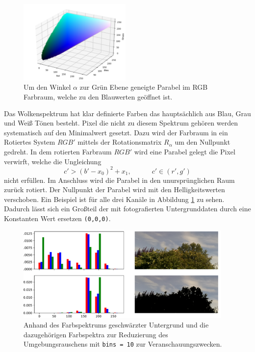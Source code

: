 \begin{figure}
		\centering
		\includegraphics[width=0.49\textwidth]{pictures/cut_cube.pdf}
		\caption{Um den Winkel $\alpha$ zur Grün Ebene geneigte Parabel im RGB 
				Farbraum, welche zu den Blauwerten geöffnet ist.}
				\label{fig:parabular}
\end{figure}
Das Wolkenspektrum hat klar definierte Farben das hauptsächlich aus Blau, Grau
und Weiß Tönen besteht.
Pixel die nicht zu diesem Spektrum gehören werden systematisch auf den
Minimalwert gesetzt.
Dazu wird der Farbraum in ein Rotiertes System $RGB'$ mittels der 
Rotationsmatrix $R_{\alpha}$ um den Nullpunkt gedreht. 
In dem rotierten Farbraum $RGB'$ wird eine Parabel gelegt die Pixel
verwirft, welche die Ungleichung 
\begin{equation}
		c' > (b' - x_0)^2 + x_1, \hspace{3em} c' \in (r', g')
\end{equation}
nicht erfüllen.
Im Anschluss wird die Parabel in den unursprünglichen Raum zurück
rotiert.
Der Nullpunkt der Parabel wird mit den Helligkeitswerten verschoben.
Ein Beispiel ist für alle  drei Kanäle in Abbildung \ref{fig:parabular} zu sehen.
Dadurch lässt sich ein Großteil der mit fotografierten Untergrunddaten durch
eine Konstanten Wert ersetzen \texttt{(0,0,0)}.
\begin{figure}
		\centering
		\includegraphics[width=0.95\textwidth]{pictures/cut_hist.pdf}
		\caption{Anhand des Farbspektrums geschwärzter Untergrund und die
		dazugehörigen Farbspektra zur Reduzierung des Umgebungsrauschens mit
		\texttt{bins = 10} zur Veranschauungszwecken.}
		\label{fig:name}
\end{figure}

